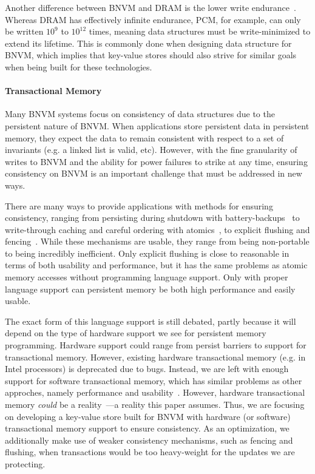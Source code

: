 Another difference between BNVM and DRAM is the lower write
endurance~\cite{dhiman_pdram:_2009}. Whereas DRAM has effectively infinite
endurance, PCM, for example, can only be written $10^9$ to $10^{12}$ times,
meaning data structures must be write-minimized to extend its lifetime. This is
commonly done when designing data structure for BNVM, which implies that
key-value stores should also strive for similar goals when being built for these
technologies.

\paragraph{Transactional Memory}

Many BNVM systems focus on consistency of data structures due to the
persistent nature of BNVM. When applications store persistent data in
persistent memory, they expect the data to remain consistent with respect to a
set of invariants (e.g. a linked list is valid, etc). However, with the fine
granularity of writes to BNVM and the ability for power failures to strike at
any time, ensuring consistency on BNVM is an important challenge that must be
addressed in new ways.

There are many ways to provide applications with methods for ensuring
consistency, ranging from persisting during shutdown with
battery-backups~\cite{narayanan:asplos12} to write-through caching and careful
ordering with atomics~\cite{bhandari2012implications}, to explicit flushing and
fencing~\cite{condit:sosp09}. While these mechanisms are usable, they range from
being non-portable to being incredibly inefficient. Only explicit flushing is
close to reasonable in terms of both usability and performance, but it has the
same problems as atomic memory accesses without programming language support.
Only with proper language support can persistent memory be both high performance
and easily usable.

The exact form of this language support is still debated, partly because it will
depend on the type of hardware support we see for persistent memory programming.
Hardware support could range from persist barriers to support for transactional
memory. However, existing hardware transactional memory (e.g. in Intel
processors) is deprecated due to bugs. Instead, we are left with enough support
for software transactional memory, which has similar problems as other
approches, namely performance and usability~\cite{stm}. However, hardware
transactional memory \textit{could} be a
reality~\cite{kolli:asplos16,lu:tos16,wang:cal15}---a reality this paper
assumes. Thus, we are focusing on developing a key-value store built for BNVM
with hardware (or software) transactional memory support to ensure consistency.
As an optimization, we additionally make use of weaker consistency mechanisms,
such as fencing and flushing, when transactions would be too heavy-weight for
the updates we are protecting.

